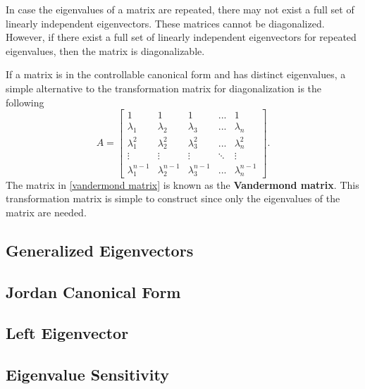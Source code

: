 \documentclass[conference,12pt,onecolumn,compsoc]{IEEEtran}
\begin{document}
In case the eigenvalues of a matrix are repeated, there may not exist a full set of linearly independent eigenvectors. These matrices cannot be diagonalized. However, if there exist a full set of linearly independent eigenvectors for repeated eigenvalues, then the matrix is diagonalizable. 

If a matrix is in the controllable canonical form and has distinct eigenvalues, a simple alternative to the transformation matrix for diagonalization is the following
\begin{equation}
A=\begin{bmatrix} 1 & 1 & 1 & ... & 1 \\ 
\lambda_1 & \lambda_2 & \lambda_3 & ...  & \lambda_n \\
\lambda^2_1 & \lambda^2_2 & \lambda^2_3 & ...  & \lambda^2_n \\
\vdots & \vdots & \vdots & \ddots  & \vdots \\
\lambda^{n-1}_1 & \lambda^{n-1}_2 & \lambda^{n-1}_3 & ...  & \lambda^{n-1}_n   \end{bmatrix}.
\label{vandermond matrix}
\end{equation}
The matrix in \eqref{vandermond matrix} is known as the \textbf{Vandermond matrix}. This transformation matrix is simple to construct since only the eigenvalues of the matrix are needed.



\subsection{Generalized Eigenvectors}
\label{section: Generalized Eigenvectors}

\subsection{Jordan Canonical Form}
\label{section: Jordan Canonical Form}

\subsection{Left Eigenvector}
\label{section: Left Eigenvector}

\subsection{Eigenvalue Sensitivity}
\label{section: Eigenvalue Sensitivity}
\end{document}
